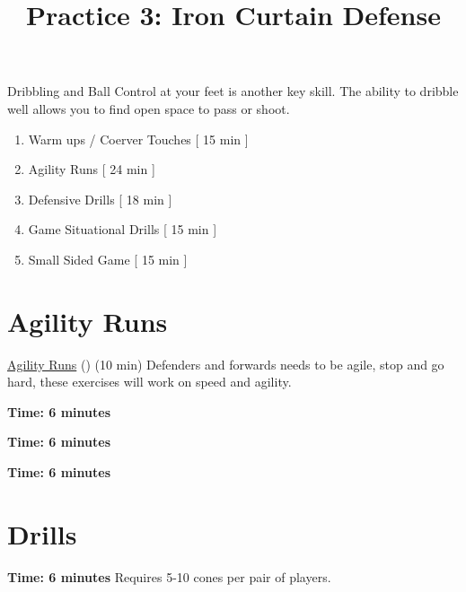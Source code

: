\documentclass[10pt,letterpaper]{article}
\title{Practice 3: Iron Curtain Defense}
\author{}
\date{}
\newenvironment{agendablock}[1]{%
    \tcolorbox[beamer,%
    noparskip,breakable,
    colback=LightGray,colframe=DarkGray,%
    colbacklower=Gray!75!LightGray,%
    title=#1]}%
    {\endtcolorbox}
\begin{document}
\selectfont
\maketitle

\begin{agendablock}{Practice Activities}
    Dribbling and Ball Control at your feet is another key skill.  The ability to dribble well allows you to find open space to pass or shoot. 
    \begin{enumerate}
        \item Warm ups / Coerver Touches [ 15 min ]
        \item Agility Runs [ 24 min ]
        \item Defensive Drills [ 18 min ]
        \item Game Situational Drills [ 15 min ]
        \item Small Sided Game [ 15 min ]
    \end{enumerate}
\end{agendablock}



\clearpage



\section{Agility Runs}
\href{https://www.youtube.com/watch?v=3ew2m3m5f0M}{Agility Runs} () (10 min)
Defenders and forwards needs to be agile, stop and go hard, these exercises will work on speed and agility.

\textbf{Time: 6 minutes}


\textbf{Time: 6 minutes}


\textbf{Time: 6 minutes}


\clearpage

\section{Drills}

\textbf{Time: 6 minutes}  Requires 5-10 cones per pair of players.

\end{document}
